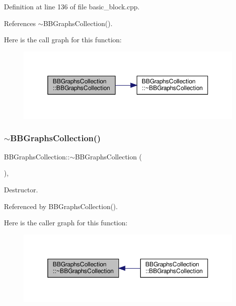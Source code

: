 Definition at line 136 of file basic\+\_\+block.\+cpp.



References $\sim$\+B\+B\+Graphs\+Collection().

Here is the call graph for this function\+:
\nopagebreak
\begin{figure}[H]
\begin{center}
\leavevmode
\includegraphics[width=344pt]{d9/d1a/classBBGraphsCollection_af667f3f37b38a6c1e24c510c4b867635_cgraph}
\end{center}
\end{figure}
\mbox{\label{classBBGraphsCollection_a7e0b07719033e01bea52afd9f399b25c}} 
\subsubsection{\texorpdfstring{$\sim$\+B\+B\+Graphs\+Collection()}{~BBGraphsCollection()}}
{\footnotesize\ttfamily B\+B\+Graphs\+Collection\+::$\sim$\+B\+B\+Graphs\+Collection (\begin{DoxyParamCaption}{ }\end{DoxyParamCaption})\hspace{0.3cm}{\ttfamily [override]}, {\ttfamily [default]}}



Destructor. 



Referenced by B\+B\+Graphs\+Collection().

Here is the caller graph for this function\+:
\nopagebreak
\begin{figure}[H]
\begin{center}
\leavevmode
\includegraphics[width=344pt]{d9/d1a/classBBGraphsCollection_a7e0b07719033e01bea52afd9f399b25c_icgraph}
\end{center}
\end{figure}


